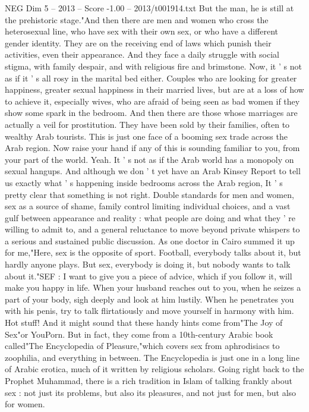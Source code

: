 \begin{textsample}{NEG Dim 5 – 2013 – Score -1.00 – 2013/t001914.txt}
But the man, he is still at the prehistoric stage."And then there are men and women who cross the heterosexual line, who have sex with their own sex, or who have a different gender identity.
They are on the receiving end of laws which punish their activities, even their appearance.
And they face a daily struggle with social stigma, with family despair, and with religious fire and brimstone.
Now, it ' s not as if it ' s all rosy in the marital bed either.
Couples who are looking for greater happiness, greater sexual happiness in their married lives, but are at a loss of how to achieve it, especially wives, who are afraid of being seen as bad women if they show some spark in the bedroom.
And then there are those whose marriages are actually a veil for prostitution.
They have been sold by their families, often to wealthy Arab tourists.
This is just one face of a booming sex trade across the Arab region.
Now raise your hand if any of this is sounding familiar to you, from your part of the world.
Yeah.
It ' s not as if the Arab world has a monopoly on sexual hangups.
And although we don ' t yet have an Arab Kinsey Report to tell us exactly what ' s happening inside bedrooms across the Arab region, It ' s pretty clear that something is not right.
Double standards for men and women, sex as a source of shame, family control limiting individual choices, and a vast gulf between appearance and reality : what people are doing and what they ' re willing to admit to, and a general reluctance to move beyond private whispers to a serious and sustained public discussion.
As one doctor in Cairo summed it up for me,"Here, sex is the opposite of sport.
Football, everybody talks about it, but hardly anyone plays.
But sex, everybody is doing it, but nobody wants to talk about it."SEF : I want to give you a piece of advice, which if you follow it, will make you happy in life.
When your husband reaches out to you, when he seizes a part of your body, sigh deeply and look at him lustily.
When he penetrates you with his penis, try to talk flirtatiously and move yourself in harmony with him.
Hot stuff!
And it might sound that these handy hints come from"The Joy of Sex"or YouPorn.
But in fact, they come from a 10th-century Arabic book called"The Encyclopedia of Pleasure,"which covers sex from aphrodisiacs to zoophilia, and everything in between.
The Encyclopedia is just one in a long line of Arabic erotica, much of it written by religious scholars.
Going right back to the Prophet Muhammad, there is a rich tradition in Islam of talking frankly about sex : not just its problems, but also its pleasures, and not just for men, but also for women.

\end{textsample}
